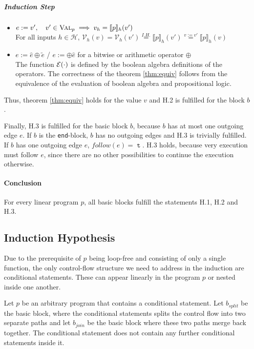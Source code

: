 \subparagraph{Induction Step}
\begin{itemize}
    \item $e := v', \quad v' \in \textsc{Val}_p \implies v_h = \llbracket p \rrbracket_h (v')$\\
    For all inputs $h \in \mathcal{H}$, $\mathcal{V}_h(v) = \mathcal{V}_h(v') \stackrel{I.H.}{=} \llbracket p \rrbracket_h(v') \stackrel{v := v'}{=} \llbracket p \rrbracket_h(v)$
    \item $e := \hat{e} \oplus \tilde{e}$ / $ e := \oplus \hat{e}$ for a bitwise or arithmetic operator $\oplus$\\
    The function $\mathcal{E}(\cdot)$ is defined by the boolean algebra definitions of the operators. The correctness of the theorem \ref{thm:equiv} follows from the equivalence of the evaluation of boolean algebra and propositional logic.
\end{itemize}
Thus, theorem \ref{thm:equiv} holds for the value $v$ and H.2 is fulfilled for the block $b$.

Finally, H.3 is fulfilled for the basic block $b$, because $b$ has at most one outgoing edge $e$. If $b$ is the \texttt{end}-block, $b$ has no outgoing edges and H.3 is trivially fulfilled. If $b$ has one outgoing edge $e$, $follow(e) = \mttt$. H.3 holds, because very execution must follow $e$, since there are no other possibilities to continue the execution otherwise.\\[1em]

\paragraph{Conclusion}
For every linear program $p$, all basic blocks fulfill the statements H.1, H.2 and H.3.

\subsection*{Induction Hypothesis}
Due to the prerequisite of $p$ being loop-free and consisting of only a single function, the only control-flow structure we need to address in the induction are conditional statements. These can appear linearly in the program $p$ or nested inside one another.

Let $p$ be an arbitrary program that contains a conditional statement. Let $b_{split}$ be the basic block, where the conditional statements splits the control flow into two separate paths and let $b_{join}$ be the basic block where these two paths merge back together. The conditional statement does not contain any further conditional statements inside it.

